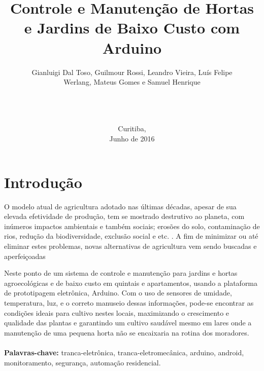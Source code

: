 \documentclass[a4paper,12pt]{article}
\begin{document}
\title{Controle e Manutenção de Hortas e Jardins de Baixo Custo com Arduino}
\author{Gianluigi Dal Toso, Guilmour Rossi, Leandro Vieira, Luís Felipe\\Werlang, Mateus Gomes e Samuel Henrique\\\texttt{}\\\\\\
}

\date{Curitiba, \\Junho de 2016}

\maketitle

\newpage


\tableofcontents


\newpage

\listoffigures

\newpage

\listoftables

\makenomenclature

\newpage
\section{Introdução}

	O modelo atual de agricultura adotado nas últimas décadas, apesar de sua elevada efetividade de produção, tem se mostrado destrutivo ao planeta, com inúmeros impactos ambientais e também sociais; erosões do solo, contaminação de rios, redução da biodiversidade, exclusão social e etc. \cite[p.~23]{medeiros}. A fim de minimizar ou até eliminar estes problemas, novas alternativas de agricultura vem sendo buscadas e aperfeiçoadas

Neste ponto  de um sistema de controle e manutenção para jardins e hortas agroecológicas e de baixo custo em quintais e apartamentos, usando a plataforma de prototipagem eletrônica, Arduino. Com o uso de sensores de umidade, temperatura, luz, e o correto manuseio dessas informações, pode-se encontrar as condições ideais para cultivo nestes locais, maximizando o crescimento e qualidade das plantas e garantindo um cultivo saudável mesmo em lares onde a manutenção de uma pequena horta não se encaixaria na rotina dos moradores.
  \textbf{\\\\Palavras-chave:} tranca-eletrônica, tranca-eletromecânica, arduino, android, monitoramento, segurança, automação residencial.
\end{document}
